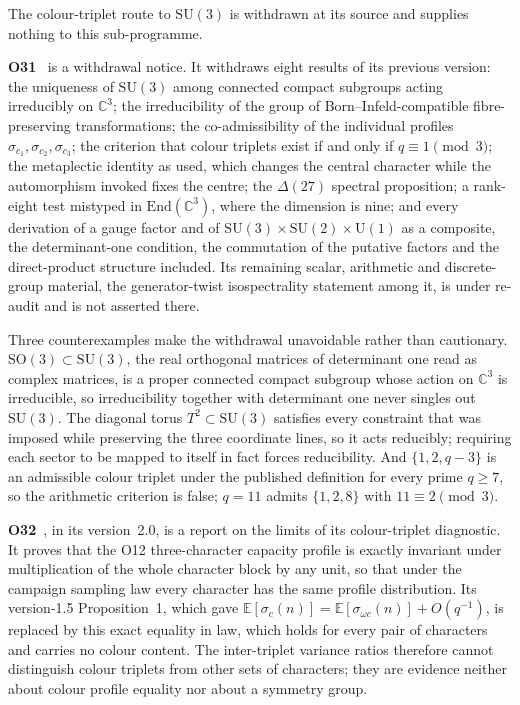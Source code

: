 \documentclass[11pt,a4paper]{article}
\theoremstyle{definition}
\newcommand{\SU}{\mathrm{SU}}
\newcommand{\SO}{\mathrm{SO}}
\newcommand{\UU}{\mathrm{U}}
\begin{document}
      The colour-triplet route to $\SU(3)$ is withdrawn at its source and supplies nothing to this
      sub-programme.

      \textbf{O31}~\cite{Beau2026a35} is a withdrawal notice.
      It withdraws eight results of its previous version: the uniqueness of $\SU(3)$ among
      connected compact subgroups acting irreducibly on $\mathbb{C}^3$; the irreducibility of the
      group of Born--Infeld-compatible fibre-preserving transformations; the co-admissibility of
      the individual profiles $\sigma_{c_1}, \sigma_{c_2}, \sigma_{c_3}$; the criterion that colour
      triplets exist if and only if $q \equiv 1 \pmod 3$; the metaplectic identity as used, which
      changes the central character while the automorphism invoked fixes the centre; the
      $\Delta(27)$ spectral proposition; a rank-eight test mistyped in $\mathrm{End}(\mathbb{C}^3)$,
      where the dimension is nine; and every derivation of a gauge factor and of
      $\SU(3) \times \SU(2) \times \UU(1)$ as a composite, the determinant-one condition, the
      commutation of the putative factors and the direct-product structure included.
      Its remaining scalar, arithmetic and discrete-group material, the generator-twist
      isospectrality statement among it, is under re-audit and is not asserted there.

      Three counterexamples make the withdrawal unavoidable rather than cautionary.
      $\SO(3) \subset \SU(3)$, the real orthogonal matrices of determinant one read as complex
      matrices, is a proper connected compact subgroup whose action on $\mathbb{C}^3$ is
      irreducible, so irreducibility together with determinant one never singles out $\SU(3)$.
      The diagonal torus $T^2 \subset \SU(3)$ satisfies every constraint that was imposed while
      preserving the three coordinate lines, so it acts reducibly; requiring each sector to be
      mapped to itself in fact forces reducibility.
      And $\{1, 2, q-3\}$ is an admissible colour triplet under the published definition for every
      prime $q \geq 7$, so the arithmetic criterion is false; $q = 11$ admits $\{1, 2, 8\}$ with
      $11 \equiv 2 \pmod 3$.

      \textbf{O32}~\cite{Beau2026a36}, in its version~2.0, is a report on the limits of its
      colour-triplet diagnostic.
      It proves that the O12 three-character capacity profile is exactly invariant under
      multiplication of the whole character block by any unit, so that under the campaign sampling
      law every character has the same profile distribution.
      Its version-1.5 Proposition~1, which gave
      $\mathbb{E}[\sigma_c(n)] = \mathbb{E}[\sigma_{\omega c}(n)] + O(q^{-1})$, is replaced by this
      exact equality in law, which holds for every pair of characters and carries no colour content.
      The inter-triplet variance ratios therefore cannot distinguish colour triplets from other sets
      of characters; they are evidence neither about colour profile equality nor about a symmetry
      group.
\end{document}
